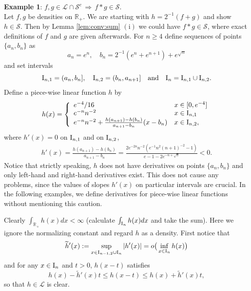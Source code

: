 \documentclass[12pt,leqno]{amsart}
\newcommand{\rI}{{\rm I}}
\newcommand{\R}{\mathbb{R}}
\newcommand{\wt}{\widetilde}
\newcommand{\cals}{{\mathcal S}}
\newcommand{\call}{{\mathcal L}}
\newcommand{\1}{{\mathbf 1}}
\begin{document}
\noindent
{\bf Example 1}: 
$f,g\in \call \cap \cals^c\, \Rightarrow\, f\ast g \in \cals$. \vspace{2mm}\\
Let $f,g$ be densities on $\R_+$. We are starting with $h=2^{-1}(f+g)$ and show $h\in \cals$. 
Then by Lemma  \ref{lem:conv:sum} $(\mathrm{i})$ we could have $f\ast g \in \cals$, where 
exact definitions of $f$ and $g$ are given afterwards. 
For $n\ge 4$ define sequences of points $\{a_n,b_n\}$ as 
\[
 a_n=e^n,\quad b_n=2^{-1}(e^n+e^{n+1})+e^{\sqrt{n}}
\]
and set intervals 
\[
 \rI_{n,1}= (a_n,b_n],\quad \rI_{n,2}=(b_n,a_{n+1}]\quad \text{and}\quad \rI_n=\rI_{n,1}\cup \rI_{n,2}.
\]
Define a piece-wise linear function $h$ by 
\begin{align*}
h(x)= \left\{
\begin{array}{ll}
e^{-4}/16 & x\in [0,e^{-4}]  \\
e^{-n}n^{-2} & x\in \rI_{n,1} \\
e^{-n}n^{-2} +\frac{h(a_{n+1})-h(b_n)}{a_{n+1}-b_n}(x-b_n) & x\in \rI_{n,2}, \\
\end{array}
\right.
\end{align*}
where $h'(x)=0$ on $\rI_{n,1}$ and on $\rI_{n,2}$,  
\begin{align}
\label{h':ex1}
 h'(x) %
= \frac{h(a_{n+1})-h(b_n)}{a_{n+1}-b_n} = \frac{2e^{-2n}n^{-2}(e^{-1}n^2 (n+1)^{-2}-1)}{e-1-2e^{-n+\sqrt{n}}}<0. 
\end{align}
Notice that strictly speaking, $h$ does not have derivatives on points $\{a_n,b_n\}$ and only 
left-hand and right-hand derivatives exist. This does not cause any problems, 
since the values of slopes $h'(x)$ on particular intervals are crucial. In the following examples, we 
define derivatives for piece-wise linear functions without mentioning this caution. 


Clearly $\int_{\R_+}h(x)dx <\infty$ (calculate $\int_{\rI_n}h(x)dx$ and take the sum). Here we ignore the normalizing constant 
and regard $h$ as a density. 
First notice that 
\[
 \wt h'(x) := \sup_{x\in \rI_{n-1,2}\cup \rI_n}|h'(x)| =o \big(\inf_{x\in \rI_n} h(x)\big)
\]
and for any $x\in \rI_n$ and $t>0$, $h(x-t)$ satisfies 
\[
 h(x)-\wt h'(x) t \le h(x-t) \le h(x)+ \wt h'(x) t,
\]
so that $h\in \call$ is clear.
\end{document}
